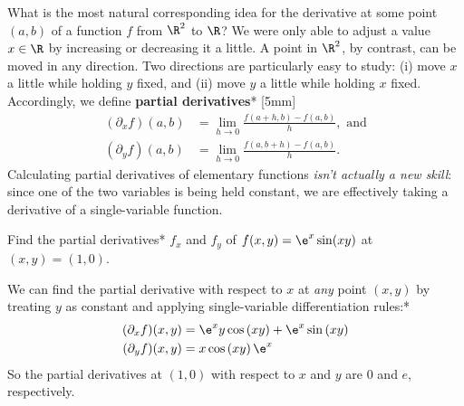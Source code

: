 \documentclass{watsonbook}
\begin{document}
What is the most natural corresponding idea for the derivative at some
point $(a,b)$ of a function $f$ from $\R^2$ to $\R$? We were only able
to adjust a value $x\in \R$ by increasing or decreasing it a little. A
point in $\R^2$, by contrast, can be moved in any direction. Two
directions are particularly easy to study: (i) move $x$ a little while
holding $y$ fixed, and (ii) move $y$ a little while holding $x$
fixed. Accordingly, we define \textbf{partial derivatives}*
[5mm]
\begin{align*}
  (\partial_x f)(a,b) &= \lim_{h \to 0}\frac{f(a+h,b) - f(a,b)}{h},
                        \text{ and} \\
  (\partial_y f)(a,b) &= \lim_{h \to 0}\frac{f(a,b+h) - f(a,b)}{h}. 
\end{align*}
Calculating partial derivatives of elementary functions \textit{isn't
  actually a new skill}: since one of the two
variables is being held constant, we are effectively taking a
derivative of a single-variable function.

\begin{example}{}{}
  Find the partial derivatives* $f_x$ and $f_y$ of
  $f(x,y) = \e^x \sin (xy)$ at $(x,y) = (1,0)$. 
\end{example}

\begin{solution}
  We can find the partial derivative with respect to $x$ at
  \textit{any} point $(x,y)$ by treating $y$ as constant and applying
  single-variable differentiation rules:* 
  \begin{align*}
    (\partial_xf)(x,y) &= \e^{x} y \cos\left(x y\right) + \e^{x}
                         \sin\left(x y\right) \\  
    (\partial_yf)(x,y)  &= x \cos\left(x y\right) \e^{x}
  \end{align*}
  So the partial derivatives at $(1,0)$ with respect to $x$ and $y$
  are 0 and $e$, respectively.
\end{solution}
\end{document}
